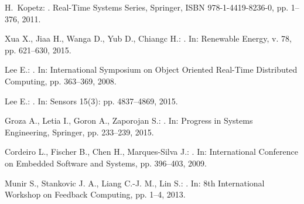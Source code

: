 \documentclass{acm_sen_article}
\begin{document}
{{%






\begin{thebibliography}{1}

H.~Kopetz:
.
\newblock Real-Time Systems Series, Springer, ISBN 978-1-4419-8236-0, pp. 1--376, 2011.

Xua X., Jiaa H., Wanga D., Yub D., Chiangc H.:
.
\newblock In: Renewable Energy, v. 78, pp. 621--630, 2015.

Lee E.:
.
\newblock In: International Symposium on Object Oriented Real-Time Distributed Computing, pp. 363--369, 2008.

Lee E.:
. 
\newblock In: Sensors 15(3): pp. 4837--4869, 2015.

Groza A., Letia I., Goron A., Zaporojan S.: 
.
\newblock In: Progress in Systems Engineering, Springer, pp. 233--239, 2015.

Cordeiro L., Fischer B., Chen H., Marques-Silva J.:
.
\newblock In: International Conference on Embedded Software and Systems, pp. 396--403, 2009.

Munir S., Stankovic J. A., Liang C.-J. M., Lin S.:
. 
\newblock In: 8th International Workshop on Feedback Computing, pp. 1--4, 2013.


\end{thebibliography}}}
\end{document}
